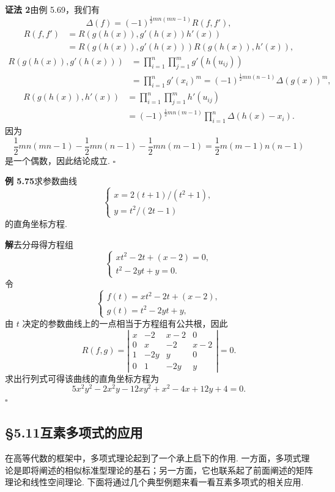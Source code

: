\documentclass[UTF8,12pt,a4paper,fontset=fandol]{ctexart}
\begin{document}
\noindent\textbf{证法 2}\quad 由例 5.69，我们有
\[
\Delta(f)=(-1)^{\frac12 mn(mn-1)}R(f,f'),
\]
\[
\begin{aligned}
R(f,f')
&=R(g(h(x)),g'(h(x))h'(x))\\
&=R(g(h(x)),g'(h(x)))R(g(h(x)),h'(x)),
\end{aligned}
\]
\[
\begin{aligned}
R(g(h(x)),g'(h(x)))
&=\prod_{i=1}^n\prod_{j=1}^m g'(h(u_{ij}))\\
&=\prod_{i=1}^n g'(x_i)^m
=(-1)^{\frac12 mn(n-1)}\Delta(g(x))^m,
\end{aligned}
\]
\[
\begin{aligned}
R(g(h(x)),h'(x))
&=\prod_{i=1}^n\prod_{j=1}^m h'(u_{ij})\\
&=(-1)^{\frac12 mn(m-1)}\prod_{i=1}^n\Delta(h(x)-x_i).
\end{aligned}
\]
因为
\[
\frac12 mn(mn-1)-\frac12 mn(n-1)-\frac12 mn(m-1)=\frac12 m(m-1)n(n-1)
\]
是一个偶数，因此结论成立. \hfill $\square$

\noindent\textbf{例 5.75}\quad 求参数曲线
\[
\left\{
\begin{array}{l}
x=2(t+1)/(t^2+1),\\
y=t^2/(2t-1)
\end{array}
\right.
\]
的直角坐标方程.

\noindent\textbf{解}\quad 去分母得方程组
\[
\left\{
\begin{array}{l}
xt^2-2t+(x-2)=0,\\
t^2-2yt+y=0.
\end{array}
\right.
\]
令
\[
\left\{
\begin{array}{l}
f(t)=xt^2-2t+(x-2),\\
g(t)=t^2-2yt+y,
\end{array}
\right.
\]
由 $t$ 决定的参数曲线上的一点相当于方程组有公共根，因此
\[
R(f,g)=
\left|\begin{array}{cccc}
x & -2 & x-2 & 0\\
0 & x & -2 & x-2\\
1 & -2y & y & 0\\
0 & 1 & -2y & y
\end{array}\right|=0.
\]
求出行列式可得该曲线的直角坐标方程为
\[
5x^2y^2-2x^2y-12xy^2+x^2-4x+12y+4=0.
\]
\hfill $\square$

\subsection*{§5.11\quad 互素多项式的应用}

在高等代数的框架中，多项式理论起到了一个承上启下的作用. 一方面，多项式理论是即将阐述的相似标准型理论的基石；另一方面，它也联系起了前面阐述的矩阵理论和线性空间理论. 下面将通过几个典型例题来看一看互素多项式的相关应用.
\end{document}
